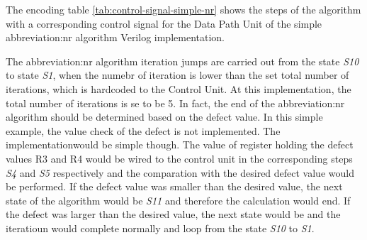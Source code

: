 \documentclass[a4paper, twoside, 11pt]{article}
\begin{document}
            The encoding table \ref{tab:control-signal-simple-nr} shows the steps of the algorithm with a corresponding control signal for the Data Path Unit of the simple \gls{abbreviation:nr} algorithm Verilog implementation.\par
            The \gls{abbreviation:nr} algorithm iteration jumps are carried out from the state \textit{S10} to state \textit{S1}, when the numebr of iteration is lower than the set total number of iterations, which is hardcoded to the Control Unit. At this implementation, the total number of iterations is se to be 5. In fact, the end of the \gls{abbreviation:nr} algorithm should be determined based on the defect value. In this simple example, the value check of the defect is not implemented. The implementationwould be simple though. The value of register holding the defect values R3 and R4 would be wired to the control unit in the corresponding steps \textit{S4} and \textit{S5} respectively and the comparation with the desired defect value would be performed. If the defect value was smaller than the desired value, the next state of the algorithm would be \textit{S11} and therefore the calculation would end. If the defect was larger than the desired value, the next state would be  and the iteratioun would complete normally and loop from the state \textit{S10} to \textit{S1}.
\end{document}

